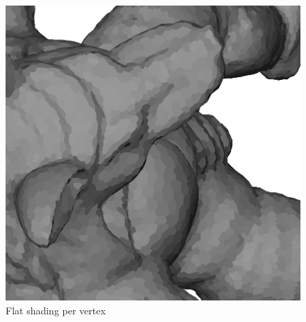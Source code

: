 \begin{figure}[h]
    \endminipage\hfill
    \centering
    \includegraphics[scale=0.3]{images/armadillo-extendfs-2.png}
    \endminipage
    \caption{Flat shading per vertex}
\end{figure}

